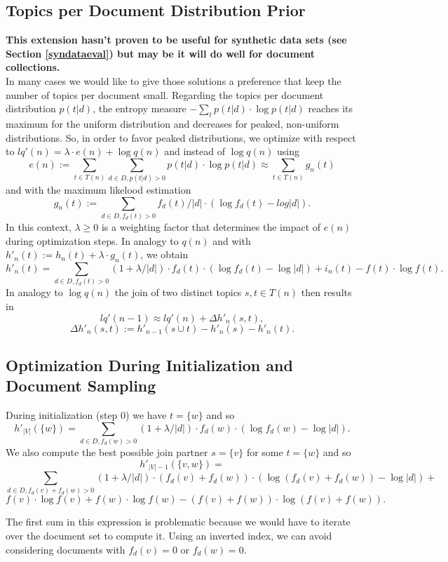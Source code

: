 \documentclass[10pt, a4paper, oneside]{article}
\begin{document}
\subsection{Topics per Document Distribution Prior}
\textbf{This extension hasn't proven to be useful for synthetic data sets (see Section \ref{syndataeval}) but may be it will do well for document collections.}\\
In many cases we would like to give those solutions a preference that keep the number of topics per document small. Regarding the topics per document distribution $p(t|d)$, the entropy measure $- \sum_t p(t|d) \cdot \log p(t|d)$ reaches its maximum for the uniform distribution and decreases for peaked, non-uniform distributions. So, in order to favor peaked distributions, we optimize with respect to $lq'(n) = \lambda \cdot e(n) + \log q(n)$ and instead of $\log q(n)$ using
\[ e(n) := \sum_{t \in T(n)} \sum_{d \in D, p(t | d) > 0} p(t | d) \cdot \log p(t | d) \approx \sum_{t \in T(n)} g_n(t)\]
and with the maximum likelood estimation
\[ g_n(t) :=  \sum_{d \in D, f_d(t) > 0} f_d(t) / |d| \cdot (\log f_d(t) - log |d|).\]
In this context, $\lambda \geq 0$ is a weighting factor that determines the impact of $e(n)$ during optimization steps.
In analogy to $q(n)$ and with $h'_n(t) := h_n(t) + \lambda \cdot g_n(t)$, we obtain
\[ h'_n(t) = \sum_{d \in D, f_d(t) > 0} (1 + \lambda / |d|) \cdot f_d(t) \cdot (\log f_d(t) - \log |d|) + i_n(t) - f(t) \cdot \log f(t).\]
In analogy to $\log q(n)$ the join of two distinct topics $s, t \in T(n)$ then results in
\[ lq'(n-1) \approx lq'(n) + \Delta h'_n(s,t),\]  
\[\Delta h'_n(s,t) := h'_{n - 1}(s \cup t) - h'_n(s) - h'_n(t).\]

\subsection{Optimization During Initialization and Document Sampling}
During initialization (step 0) we have $t = \{ w \}$ and so
\[ h'_{|V|}(\{w\}) = \sum_{d \in D, f_d(w) > 0} (1 + \lambda / |d|) \cdot f_d(w) \cdot (\log f_d(w) - \log |d|).\]
We also compute the best possible join partner $s = \{ v \}$ for some $t = \{ w \}$ and so 
\[ h'_{|V| - 1}(\{ v, w \}) = \]
\[\sum_{d \in D, f_d(v) + f_d(w) > 0} (1 + \lambda / |d|) \cdot (f_d(v) + f_d(w)) \cdot (\log (f_d(v) + f_d(w)) - \log |d|) + \]
\[f(v) \cdot \log f(v) + f(w) \cdot \log f(w) - (f(v) + f(w)) \cdot \log (f(v) + f(w)).\]

The first sum in this expression is problematic because we would have to iterate over the document set to compute it. 
Using an inverted index, we can avoid considering documents with $f_d(v) = 0$ or $f_d(w) = 0$.
\end{document}
